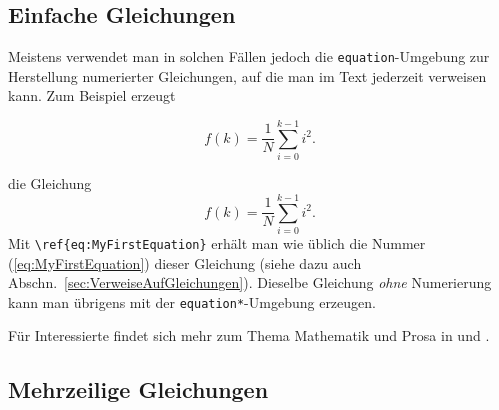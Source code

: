 \subsection{Einfache Gleichungen} 

Meistens verwendet man in solchen Fällen jedoch die \texttt{equation}-Umgebung zur Herstellung numerierter Gleichungen, auf die man im Text jederzeit verweisen kann. Zum Beispiel erzeugt
%
\begin{LaTeXCode}
\begin{equation}
  f(k) = \frac{1}{N} \sum_{i=0}^{k-1} i^2 . 
  \label{eq:MyFirstEquation}
\end{equation}
\end{LaTeXCode}
%
die Gleichung
%
\begin{equation}
  f(k) = \frac{1}{N} \sum_{i=0}^{k-1} i^2 . 
\label{eq:MyFirstEquation}
\end{equation}
%
Mit \verb!\ref{eq:MyFirstEquation}! erhält man wie üblich die Nummer (\ref{eq:MyFirstEquation}) dieser Gleichung (siehe dazu auch Abschn.\ \ref{sec:VerweiseAufGleichungen}). 
Dieselbe Gleichung \emph{ohne} Numerierung kann man übrigens mit der \texttt{equation*}-Umgebung erzeugen.



\begin{center}
\setlength{\fboxrule}{0.2mm}
\setlength{\fboxsep}{2mm}
\end{center}
%
Für Interessierte findet sich mehr zum Thema Mathematik und Prosa in \cite{Mermin89} und \cite{Higham98}.

\subsection{Mehrzeilige Gleichungen}


